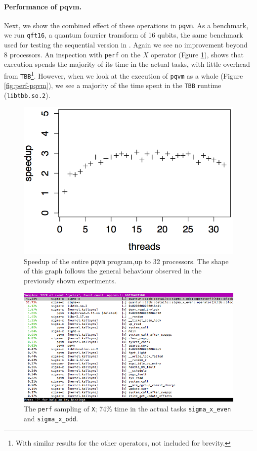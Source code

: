 \documentclass[a4paper,11pt, oneside]{report}
\newcommand{\code}[1]{\texttt{#1}}
\begin{document}
\paragraph{Performance of pqvm.} Next, we show the combined effect of these operations in \code{pqvm}. As a benchmark, we run \code{qft16}, a quantum fourrier transform of 16 qubits, the same benchmark used for testing the sequential version in \cite{vandriessche}. Again we see no improvement beyond 8 processors. An inspection with \code{perf} on the $X$ operator (Fgure \ref{fig:perf-x}), shows that execution spends the majority of its time in the actual tasks, with little overhead from \code{TBB}\footnote{With similar results for the other operators, not included for brevity.}. However, when we look at the execution of \code{pqvm} as a whole (Figure \ref{fig:perf-pqvm}), we see a majority of the time spent in the \code{TBB} runtime (\code{libtbb.so.2}).
\begin{figure}[hbp]
	\centering
	\includegraphics[width=\columnwidth]{pqvm-speedup.png}
	\caption{Speedup of the entire \code{pqvm} program,up to 32 processors. The shape of this graph follows the general behaviour observed in the previously shown experiments.}
\end{figure}

\begin{figure}[hbp]
	\centering
	\includegraphics[width=\columnwidth]{perf-sigma-x.png}
	\caption{The \code{perf} sampling of \code{X}; 74\% time in the actual tasks \code{sigma\_x\_even} and \code{sigma\_x\_odd}.}\label{fig:perf-x}
\end{figure}
\end{document}
